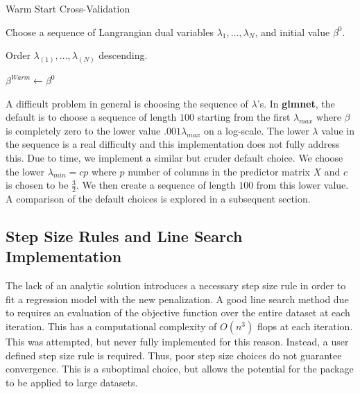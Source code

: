 \documentclass[article]{jss}
\numberwithin{equation}{section}
\begin{document}
\vspace{.2cm}
\begin{algorithm}[H]
\caption{Warm Start Cross-Validation}
Choose a sequence of Langrangian dual variables $\lambda_1, \ldots, \lambda_N$, and initial value $\beta^0$.

Order $\lambda_{(1)}, \ldots, \lambda_{(N)}$ descending.

$\beta^{Warm} \gets \beta^0$ 


\end{algorithm}
\vspace{.2cm}

A difficult problem in general is choosing the sequence of $\lambda$'s.
In \textbf{glmnet}, the default is to choose a sequence of length $100$ starting from the first $\lambda_{max}$ where $\beta$ is completely zero to the lower value $.001 \lambda_{max}$ on a log-scale.
The lower $\lambda$ value in the sequence is a real difficulty and this implementation does not fully address this.
Due to time, we implement a similar but cruder default choice.
We choose the lower $\lambda_{min} = cp$ where $p$ number of columns in the predictor matrix $X$ and $c$ is chosen to be $\frac{3}{2}$. We then create a sequence of length $100$ from this lower value.
A comparison of the default choices is explored in a subsequent section.

\subsection{Step Size Rules and Line Search Implementation}

The lack of an analytic solution introduces a necessary step size rule in order to fit a regression model with the new penalization.
A good line search method due to \cite{beck_teboulle} requires an evaluation of the objective function over the entire dataset at each iteration. This has a computational complexity of $O(n^3)$ flops at each iteration. This was attempted, but never fully implemented for this reason. Instead, a user defined step size rule is required. Thus, poor step size choices do not guarantee convergence.
This is a suboptimal choice, but allows the potential for the package to be applied to large datasets.
\end{document}
